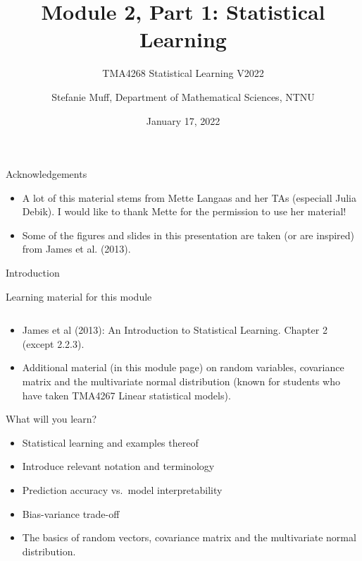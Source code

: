 \documentclass[ignorenonframetext,]{beamer}
\title{Module 2, Part 1: Statistical Learning}
\subtitle{TMA4268 Statistical Learning V2022}
\author{Stefanie Muff, Department of Mathematical Sciences, NTNU}
\date{January 17, 2022}
\begin{document}
\frame{\titlepage}

\begin{frame}{Acknowledgements}
\protect\hypertarget{acknowledgements}{}

\begin{itemize}
\item
  A lot of this material stems from Mette Langaas and her TAs (especiall
  Julia Debik). I would like to thank Mette for the permission to use
  her material!
\item
  Some of the figures and slides in this presentation are taken (or are
  inspired) from James et al. (2013).
\end{itemize}

\end{frame}

\begin{frame}{Introduction}
\protect\hypertarget{introduction}{}

\begin{block}{Learning material for this module}

\(~\)

\begin{itemize}
\item
  James et al (2013): An Introduction to Statistical Learning. Chapter 2
  (except 2.2.3).
\item
  Additional material (in this module page) on random variables,
  covariance matrix and the multivariate normal distribution (known for
  students who have taken TMA4267 Linear statistical models).
\end{itemize}

\end{block}

\end{frame}

\begin{frame}

\begin{block}{What will you learn?}

\vspace{2mm}

\begin{itemize}
\item
  Statistical learning and examples thereof \vspace{1mm}
\item
  Introduce relevant notation and terminology \vspace{1mm}
\item
  Prediction accuracy vs.~model interpretability \vspace{1mm}
\item
  Bias-variance trade-off \vspace{1mm}
\item
  The basics of random vectors, covariance matrix and the multivariate
  normal distribution.
\end{itemize}

\end{block}

\end{frame}
\end{document}
